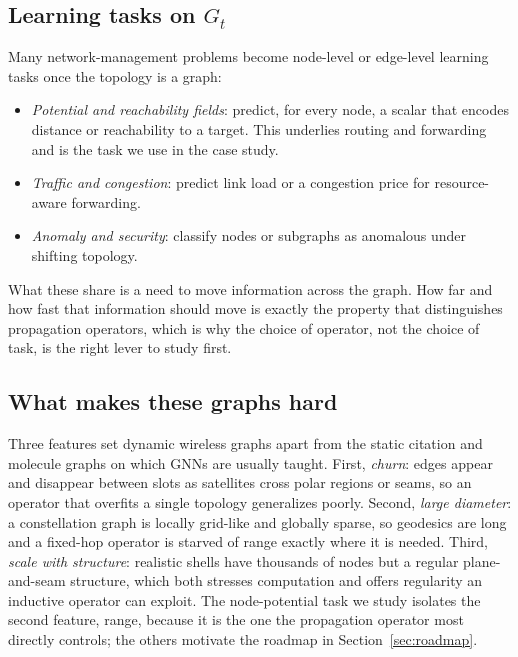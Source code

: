 \subsection{Learning tasks on $G_t$}
Many network-management problems become node-level or edge-level learning tasks once
the topology is a graph:
\begin{itemize}
\item \emph{Potential and reachability fields}: predict, for every node, a scalar
that encodes distance or reachability to a target. This underlies routing and
forwarding and is the task we use in the case study.
\item \emph{Traffic and congestion}: predict link load or a congestion price for
resource-aware forwarding.
\item \emph{Anomaly and security}: classify nodes or subgraphs as anomalous under
shifting topology.
\end{itemize}
What these share is a need to move information across the graph. How far and how fast
that information should move is exactly the property that distinguishes propagation
operators, which is why the choice of operator, not the choice of task, is the right
lever to study first.

\subsection{What makes these graphs hard}
Three features set dynamic wireless graphs apart from the static citation and molecule
graphs on which GNNs are usually taught. First, \emph{churn}: edges appear and disappear
between slots as satellites cross polar regions or seams, so an operator that overfits a
single topology generalizes poorly. Second, \emph{large diameter}: a constellation graph
is locally grid-like and globally sparse, so geodesics are long and a fixed-hop operator
is starved of range exactly where it is needed. Third, \emph{scale with structure}:
realistic shells have thousands of nodes but a regular plane-and-seam structure, which
both stresses computation and offers regularity an inductive operator can exploit. The
node-potential task we study isolates the second feature, range, because it is the one
the propagation operator most directly controls; the others motivate the roadmap in
Section~\ref{sec:roadmap}.

